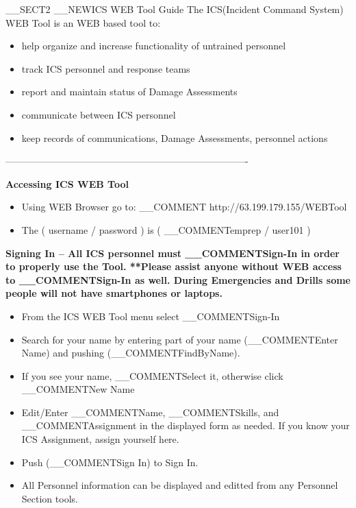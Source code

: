 \newcommand{\BF}[1]{\bf \sffamily \large #1 \normalsize \normalfont }
__SECT2 { __NEW{ICS WEB Tool Guide } 
\label{sec:ICSWEBToolGuide} }
The ICS(Incident Command System) WEB Tool is an WEB based tool to: 
\begin{itemize}
\item help organize and increase functionality of untrained personnel
\item track ICS personnel and response teams
\item report and maintain status of Damage Assessments
\item communicate between ICS personnel
\item keep records of communications, Damage Assessments, personnel actions
\end{itemize}
----------------------------------------------------------------------------

\BF{Accessing ICS WEB Tool}
\begin{itemize}
\item Using WEB Browser go to: __COMMENT{ http://63.199.179.155/WEBTool }
\item The ( username / password ) is ( __COMMENT{emprep / user101} )
\end{itemize}

\BF{Signing In}--
All ICS personnel must __COMMENT{Sign-In} in order to properly use the Tool.
\newline
**Please assist anyone without WEB access to __COMMENT{Sign-In}  as well.
During Emergencies and Drills some people will not have smartphones or laptops.
\begin{itemize}
\item From the ICS WEB Tool menu select __COMMENT{Sign-In}
\item Search for your name by entering part of your name (__COMMENT{Enter Name})
and pushing (__COMMENT{FindByName}).
\item If you see your name, __COMMENT{Select} it,
otherwise click __COMMENT{New Name}
\item Edit/Enter  __COMMENT{Name}, __COMMENT{Skills}, and __COMMENT{Assignment} in the displayed form as needed.
If you know your ICS Assignment, assign yourself here.
\item Push (__COMMENT{Sign In}) to Sign In.
\item All Personnel information can be displayed and editted 
from any Personnel Section tools.
\end{itemize}



